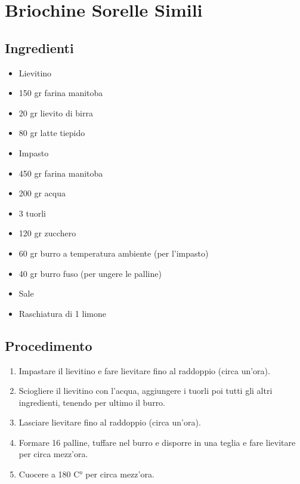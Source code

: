 \section{Briochine Sorelle Simili}
\subsection{Ingredienti}
\begin{itemize}
\item Lievitino  
\item 150 gr farina manitoba  
\item 20 gr lievito di birra  
\item 80 gr latte tiepido  
\item Impasto  
\item 450 gr farina manitoba  
\item 200 gr acqua  
\item 3 tuorli  
\item 120 gr zucchero  
\item 60 gr burro a temperatura ambiente (per l'impasto)  
\item 40 gr burro fuso (per ungere le palline)   
\item Sale  
\item Raschiatura di 1 limone
\end{itemize}
\subsection{Procedimento}
\begin{enumerate}
\item  Impastare il lievitino e fare lievitare fino al raddoppio (circa un'ora).  
\item  Sciogliere il lievitino con l'acqua, aggiungere i tuorli poi tutti gli altri ingredienti, tenendo per ultimo il burro.  
\item  Lasciare lievitare fino al raddoppio (circa un'ora).  
\item  Formare 16 palline, tuffare nel burro e disporre in una teglia e fare lievitare per circa mezz'ora.  
\item  Cuocere a 180 C° per circa mezz'ora.
\end{enumerate}
